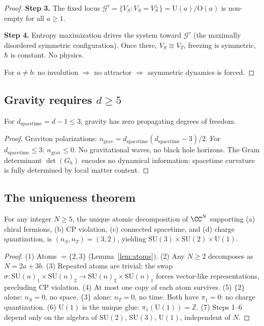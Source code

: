 \begin{remark}
\begin{proof}
\textbf{Step 3.}
The fixed locus $\mathcal{G}^\tau = \{V_S : V_S = V_S^\perp\} = \text{U}(a)/\text{O}(a)$ is non-empty for all $a \geq 1$.

\textbf{Step 4.}
Entropy maximization drives the system toward $\mathcal{G}^\tau$ (the maximally disordered symmetric configuration). Once there, $V_S \cong V_T$, freezing is symmetric, $\hbar$ is constant. No physics.

For $a \neq b$: no involution $\Rightarrow$ no attractor $\Rightarrow$ asymmetric dynamics is forced.
\end{proof}

\subsection{Gravity requires $d \geq 5$}

\begin{proposition}
For $d_\text{spacetime} = d - 1 \leq 3$, gravity has zero propagating degrees of freedom.
\end{proposition}

\begin{proof}
Graviton polarizations: $n_\text{grav} = d_\text{spacetime}(d_\text{spacetime} - 3)/2$. For $d_\text{spacetime} \leq 3$: $n_\text{grav} \leq 0$. No gravitational waves, no black hole horizons. The Gram determinant $\det(G_h)$ encodes no dynamical information: spacetime curvature is fully determined by local matter content.
\end{proof}

\subsection{The uniqueness theorem}

\begin{theorem}
\label{thm:d5}
For any integer $N \geq 5$, the unique atomic decomposition of $\CC^N$ supporting (a) chiral fermions, (b) CP violation, (c) connected spacetime, and (d) charge quantization, is $(n_S, n_T) = (3, 2)$, yielding $\text{SU}(3) \times \text{SU}(2) \times \text{U}(1)$.
\end{theorem}

\begin{proof}
(1) Atoms $= \{2, 3\}$ (Lemma~\ref{lem:atoms}). (2) Any $N \geq 2$ decomposes as $N = 2a + 3b$. (3) Repeated atoms are trivial: the swap $\sigma: \text{SU}(n)_1 \times \text{SU}(n)_2 \to \text{SU}(n)_2 \times \text{SU}(n)_1$ forces vector-like representations, precluding CP violation. (4) At most one copy of each atom survives. (5) $\{2\}$ alone: $n_S = 0$, no space. $\{3\}$ alone: $n_T = 0$, no time. Both have $\pi_1 = 0$: no charge quantization. (6) $\text{U}(1)$ is the unique glue: $\pi_1(\text{U}(1)) = \mathbb{Z}$. (7) Steps 1--6 depend only on the algebra of $\text{SU}(2)$, $\text{SU}(3)$, $\text{U}(1)$, independent of $N$.
\end{proof}


\end{remark}
